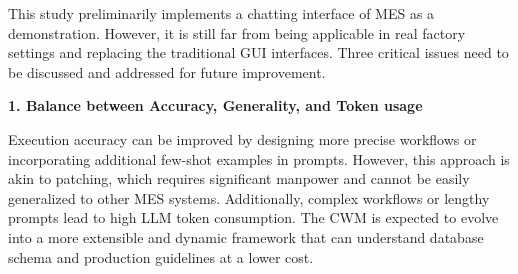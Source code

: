 \documentclass[preprint,12pt]{elsarticle}
\begin{document}








This study preliminarily implements a chatting interface of MES as a demonstration.
However, it is still far from being applicable in real factory settings and replacing the traditional GUI interfaces.
Three critical issues need to be discussed and addressed for future improvement.

\textbf{1. Balance between Accuracy, Generality, and Token usage}

Execution accuracy can be improved by designing more precise workflows or incorporating additional few-shot examples in prompts. However, this approach is akin to patching, which requires significant manpower and cannot be easily generalized to other MES systems. Additionally, complex workflows or lengthy prompts lead to high LLM token consumption.
The CWM is expected to evolve into a more extensible and dynamic framework that can understand database schema and production guidelines at a lower cost.
\end{document}
